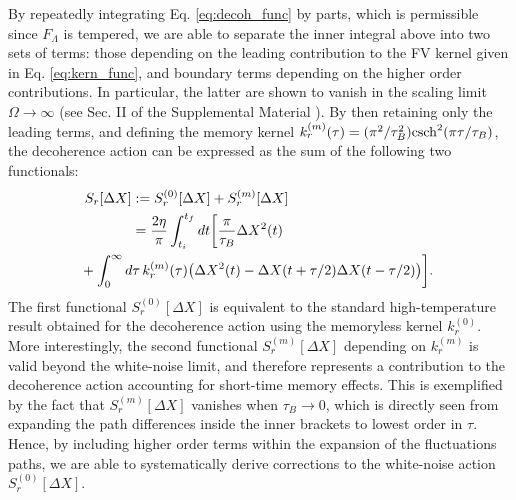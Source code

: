 \documentclass[prl,twocolumn,superscriptaddress,amsmath,amssymb]{revtex4-2}
\newcommand{\csh}{{\rm csch}}
\begin{document}
By repeatedly integrating Eq. \eqref{eq:decoh_func} 
by parts, which is permissible since $F_{\Lambda}$ is tempered, we are able to separate the inner integral above into two sets of terms: those depending on the leading contribution to the FV kernel given in Eq. \eqref{eq:kern_func}, and boundary terms depending on the higher order contributions. In particular, the latter are shown to vanish in the scaling limit $\Omega\rightarrow \infty$ (see Sec. II of the Supplemental Material \cite{SuppMat}). By then retaining only the leading terms, and defining the memory kernel $k^{(m)}_r(\tau) = (\pi^2/\tau^2_B)\csh^2(\pi \tau/\tau_B)$, 
the decoherence action can be expressed as the sum of the following two functionals:
\begin{align}\label{eq:action}
	S_r[\Delta X] &:= S^{(0)}_r[\Delta X] + S^{(m)}_r[\Delta X] \nonumber\\
    &=\frac{2\eta}{\pi}\int^{t_f}_{t_i}dt\bigg[\frac{\pi}{\tau_B} \Delta X^2(t)\nonumber\\
    &\hspace{-37pt} + \int^{\infty}_0d\tau\,k^{(m)}_r(\tau)\big(\Delta X^2(t) - \Delta X(t + \tau/2)\Delta X(t - \tau/2)\big)\bigg].
\end{align}
The first functional $S^{(0)}_r[\Delta X]$ is equivalent to the standard high-temperature result obtained for the decoherence action using the memoryless kernel $k^{(0)}_r$. More interestingly, the second functional $S^{(m)}_r[\Delta X]$ depending on $k^{(m)}_r$ is valid beyond the white-noise limit, and therefore represents a contribution to the decoherence action accounting for short-time memory effects. This is exemplified by the fact that $S^{(m)}_r[\Delta X]$ vanishes when $\tau_B\rightarrow 0$, which is directly seen from expanding the path differences inside the inner brackets to lowest order in $\tau$. Hence, by including higher order terms within the expansion of the fluctuations paths, we are able to systematically derive corrections to the white-noise action $S^{(0)}_r[\Delta X]$.
\end{document}
